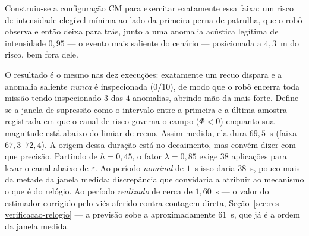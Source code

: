 Construiu-se a configuração CM para exercitar exatamente essa faixa: um risco de
intensidade elegível mínima ao lado da primeira perna de patrulha, que o robô observa
e então deixa para trás, junto a uma anomalia acústica legítima de intensidade
$0{,}95$ --- o evento mais saliente do cenário --- posicionada a $4{,}3$~m do risco,
bem fora dele.

O resultado é o mesmo nas dez execuções: exatamente um recuo dispara e a anomalia
saliente \emph{nunca} é inspecionada ($0/10$), de modo que o robô encerra toda missão
tendo inspecionado $3$ das $4$ anomalias, abrindo mão da mais forte. Define-se a
janela de supressão como o intervalo entre a primeira e a última amostra registrada
em que o canal de risco governa o campo ($\Phi<0$) enquanto sua magnitude está abaixo
do limiar de recuo. Assim medida, ela dura $69{,}5$~s (faixa $67{,}3$--$72{,}4$). %
A origem dessa duração está no decaimento, mas convém dizer com que precisão. Partindo
de $h=0{,}45$, o fator $\lambda=0{,}85$ exige $38$ aplicações para levar o canal abaixo
de $\varepsilon$. Ao período \emph{nominal} de $1$~s isso daria $38$~s, pouco mais da
metade da janela medida: discrepância que convidaria a atribuir ao mecanismo o que é
do relógio. Ao período \emph{realizado} de cerca de $1{,}60$~s
--- o valor do estimador corrigido pelo viés aferido contra contagem direta,
Seção~\ref{sec:res-verificacao-relogio} --- a previsão sobe a aproximadamente $61$~s,
que já é a ordem da janela medida.

